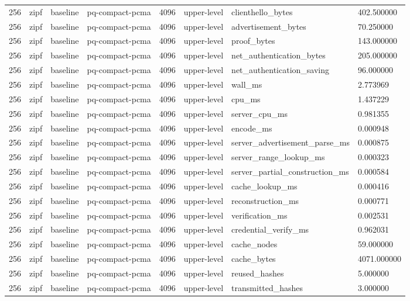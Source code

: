 \begin{tabular}{llllllll}
256 & zipf & baseline & pq-compact-pcma & 4096 & upper-level & clienthello\_bytes & 402.500000 \\
256 & zipf & baseline & pq-compact-pcma & 4096 & upper-level & advertisement\_bytes & 70.250000 \\
256 & zipf & baseline & pq-compact-pcma & 4096 & upper-level & proof\_bytes & 143.000000 \\
256 & zipf & baseline & pq-compact-pcma & 4096 & upper-level & net\_authentication\_bytes & 205.000000 \\
256 & zipf & baseline & pq-compact-pcma & 4096 & upper-level & net\_authentication\_saving & 96.000000 \\
256 & zipf & baseline & pq-compact-pcma & 4096 & upper-level & wall\_ms & 2.773969 \\
256 & zipf & baseline & pq-compact-pcma & 4096 & upper-level & cpu\_ms & 1.437229 \\
256 & zipf & baseline & pq-compact-pcma & 4096 & upper-level & server\_cpu\_ms & 0.981355 \\
256 & zipf & baseline & pq-compact-pcma & 4096 & upper-level & encode\_ms & 0.000948 \\
256 & zipf & baseline & pq-compact-pcma & 4096 & upper-level & server\_advertisement\_parse\_ms & 0.000875 \\
256 & zipf & baseline & pq-compact-pcma & 4096 & upper-level & server\_range\_lookup\_ms & 0.000323 \\
256 & zipf & baseline & pq-compact-pcma & 4096 & upper-level & server\_partial\_construction\_ms & 0.000584 \\
256 & zipf & baseline & pq-compact-pcma & 4096 & upper-level & cache\_lookup\_ms & 0.000416 \\
256 & zipf & baseline & pq-compact-pcma & 4096 & upper-level & reconstruction\_ms & 0.000771 \\
256 & zipf & baseline & pq-compact-pcma & 4096 & upper-level & verification\_ms & 0.002531 \\
256 & zipf & baseline & pq-compact-pcma & 4096 & upper-level & credential\_verify\_ms & 0.962031 \\
256 & zipf & baseline & pq-compact-pcma & 4096 & upper-level & cache\_nodes & 59.000000 \\
256 & zipf & baseline & pq-compact-pcma & 4096 & upper-level & cache\_bytes & 4071.000000 \\
256 & zipf & baseline & pq-compact-pcma & 4096 & upper-level & reused\_hashes & 5.000000 \\
256 & zipf & baseline & pq-compact-pcma & 4096 & upper-level & transmitted\_hashes & 3.000000 \\

\end{tabular}
